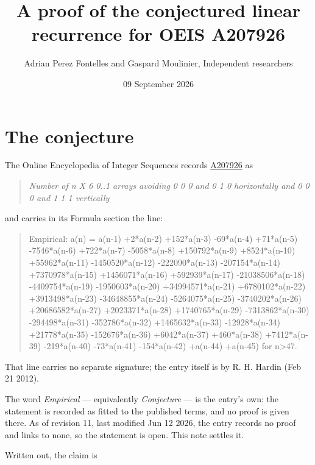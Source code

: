 \documentclass[11pt]{article}
\title{A proof of the conjectured linear recurrence for OEIS A207926}
\author{Adrian Perez Fontelles and Gaspard Moulinier, Independent researchers}
\date{09 September 2026}
\theoremstyle{definition}
\begin{document}
\maketitle
\section{The conjecture}

The Online Encyclopedia of Integer Sequences records \href{https://oeis.org/A207926}{A207926} as

\begin{quote}\itshape Number of n X 6 0..1 arrays avoiding 0 0 0 and 0 1 0 horizontally and 0 0 0 and 1 1 1 vertically\end{quote}

and carries in its Formula section the line:

\begin{quote}\ttfamily Empirical: a(n) = a(n-1) +2*a(n-2) +152*a(n-3) -69*a(n-4) +71*a(n-5) -7546*a(n-6) +722*a(n-7) -5058*a(n-8) +150792*a(n-9) +8524*a(n-10) +55962*a(n-11) -1450520*a(n-12) -222090*a(n-13) -207154*a(n-14) +7370978*a(n-15) +1456071*a(n-16) +592939*a(n-17) -21038506*a(n-18) -4409754*a(n-19) -1950603*a(n-20) +34994571*a(n-21) +6780102*a(n-22) +3913498*a(n-23) -34648855*a(n-24) -5264075*a(n-25) -3740202*a(n-26) +20686582*a(n-27) +2023371*a(n-28) +1740765*a(n-29) -7313862*a(n-30) -294498*a(n-31) -352786*a(n-32) +1465632*a(n-33) -12928*a(n-34) +21778*a(n-35) -152676*a(n-36) +6042*a(n-37) +460*a(n-38) +7412*a(n-39) -219*a(n-40) -73*a(n-41) -154*a(n-42) +a(n-44) +a(n-45) for n>47.\end{quote}

That line carries no separate signature; the entry itself is by R. H. Hardin (Feb 21 2012).

The word {\itshape Empirical} --- equivalently {\itshape Conjecture} --- is the entry's own: the statement is recorded as fitted to the published terms, and no proof is given there. As of revision 11, last modified Jun 12 2026, the entry records no proof and links to none, so the statement is open. This note settles it.

Written out, the claim is
\end{document}
